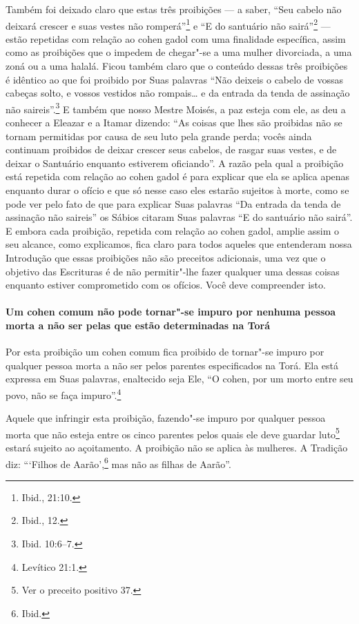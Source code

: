 \begin{multicols}{2}
Também foi deixado claro que estas três proibições --- a saber, ``Seu
cabelo não deixará crescer e suas vestes não romperá''\footnote{Ibid., 21:10.} e
``E do santuário não sairá''\footnote{Ibid., 12.} --- estão repetidas com
relação ao cohen gadol\starr{} com uma finalidade específica, assim como as
proibições que o impedem de chegar"-se a uma mulher divorciada, a uma
zoná\starr{} ou a uma halalá\starr. Ficou também claro que o conteúdo dessas
três proibições é idêntico ao que foi proibido por Suas palavras ``Não
deixeis o cabelo de vossas cabeças solto, e vossos vestidos não
rompais\ldots{} e da entrada da tenda de assinação não saireis''.\footnote{Ibid.
10:6--7.} E também que nosso Mestre Moisés, a paz esteja com ele, as deu
a conhecer a Eleazar\starr{} e a Itamar\starr{} dizendo: ``As coisas que lhes são
proibidas não se tornam permitidas por causa de seu luto pela grande
perda; vocês ainda continuam proibidos de deixar crescer seus cabelos,
de rasgar suas vestes, e de deixar o Santuário enquanto estiverem
oficiando''. A razão pela qual a proibição está repetida com relação ao
cohen gadol\starr{} é para explicar que ela se aplica apenas enquanto durar
o ofício e que só nesse caso eles estarão sujeitos à morte, como se
pode ver pelo fato de que para explicar Suas palavras ``Da entrada da
tenda de assinação não saireis'' os Sábios citaram Suas palavras ``E do
santuário não sairá''. E embora cada proibição, repetida com relação ao
cohen gadol\starr, amplie assim o seu alcance, como explicamos, fica claro
para todos aqueles que entenderam nossa Introdução que essas proibições
não são preceitos adicionais, uma vez que o objetivo das Escrituras é
de não permitir"-lhe fazer qualquer uma dessas coisas enquanto estiver
comprometido com os ofícios. Você deve compreender isto.

\paragraph{Um cohen\starr{} comum não pode tornar"-se impuro por nenhuma pessoa
morta a não ser pelas que estão determinadas na Torá\starr{}}

Por esta proibição um cohen\starr{} comum fica proibido de tornar"-se impuro
por qualquer pessoa morta a não ser pelos parentes especificados na
Torá\starr. Ela está expressa em Suas palavras, enaltecido seja Ele, ``O
cohen\starr, por um morto entre seu povo, não se faça impuro''.\footnote{Levítico
21:1.}

Aquele que infringir esta proibição, fazendo"-se impuro por qualquer
pessoa morta que não esteja entre os cinco parentes pelos quais ele deve
guardar luto\footnote{Ver o preceito positivo 37.} estará sujeito ao açoitamento. A
proibição não se aplica às mulheres. A Tradição diz: ```Filhos de
Aarão',\footnote{Ibid.} mas não as filhas de Aarão''.



\end{multicols}
